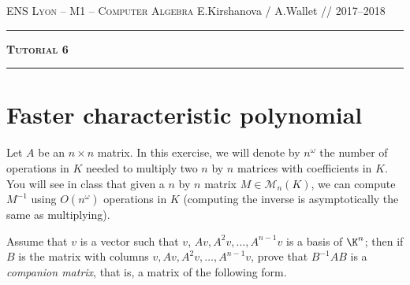 \documentclass[11pt]{exam}
\theoremstyle{definition}
\newcommand{\M}{\mathcal{M}}
\begin{document}
{\noindent
   \textsc{ENS Lyon --  M1 -- Computer Algebra}
   \hfill {E.Kirshanova / A.Wallet // 2017--2018\\
  }
  \hrule
  \begin{center}
    {\Large\textbf{
   \textsc{Tutorial 6}
    } } 
  \end{center}
  \hrule \vspace{5mm}

\thispagestyle{empty}

\vspace{0.2cm}

\section{Faster characteristic polynomial}

Let $A$ be an $n\times n$ matrix. In this exercise, we will denote by $n^\omega$ the number of operations in $K$ needed to multiply two $n$ by $n$ matrices with coefficients in $K$. You will see in class that given a $n$ by $n$ matrix $M \in \M_n(K)$, we can compute $M^{-1}$ using $O(n^\omega)$ operations in $K$ (computing the inverse is asymptotically the same as multiplying).
\begin{questions}
	
	\question 
	\label{qu:1} 
	Assume that $v$ is a vector such that $v$, $Av, A^2v, \dots, A^{n-1}v$ is
	a basis of $\K^n$; then if $B$ is the matrix with columns $v, Av, A^2v, \dots, A^{n-1}v$, prove that $B^{-1} A B$ is a {\em companion matrix}, that is, a matrix of the following form.
	

\end{questions}}
\end{document}
